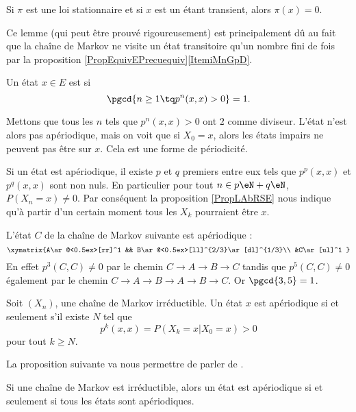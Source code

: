 \begin{lemma}
    Si \( \pi\) est une loi stationnaire et si \( x\) est un étant transient, alors \( \pi(x)=0\).
\end{lemma}
Ce lemme (qui peut être prouvé rigoureusement) est principalement dû au fait que la chaîne de Markov ne visite un état transitoire qu'un nombre fini de fois par la proposition \ref{PropEquivEPrecuequiv}\ref{ItemiMnGpD}.

\begin{definition}  \label{DefCxvOaT}
    Un état \( x\in E\) est  si
    \begin{equation}
        \pgcd\{ n\geq 1\tq p^n(x,x)>0 \}=1.
    \end{equation}
\end{definition}
Mettons que tous les \( n\) tels que \( p^n(x,x)>0\) ont \( 2\) comme diviseur. L'état n'est alors pas apériodique, mais on voit que si \( X_0=x\), alors les états impairs ne peuvent pas être sur \( x\). Cela est une forme de périodicité.

Si un état est apériodique, il existe \( p\) et \( q\) premiers entre eux tels que \( p^p(x,x)\) et \( p^q(x,x)\) sont non nuls. En particulier pour tout \( n\in p\eN+q\eN\), \( P(X_n=x)\neq 0\). Par conséquent la proposition \ref{PropLAbRSE} nous indique qu'à partir d'un certain moment tous les \( X_k\) pourraient être \( x\).

L'état \( C\) de la chaîne de Markov suivante est apériodique :
\begin{equation}
    \xymatrix{%
    A\ar@<0.5ex>[rr]^1  && B\ar@<0.5ex>[ll]^{2/3}\ar[dl]^{1/3}\\
    &C\ar[ul]^1
       }
\end{equation}
En effet \( p^3(C,C)\neq 0\) par le chemin \( C\to A\to B\to C\) tandis que \( p^5(C,C)\neq 0\) également par le chemin \( C\to A\to B\to A\to B\to C\). Or \( \pgcd\{ 3,5 \}=1\).

\begin{proposition}     \label{PropSaOysS}
    Soit \( (X_n)\), une chaîne de Markov irréductible. Un état \( x\) est apériodique si et seulement s'il existe \( N\) tel que
    \begin{equation}
        p^k(x,x)=P(X_k=x|X_0=x)>0
    \end{equation}
    pour tout \( k\geq N\).
\end{proposition}

La proposition suivante va nous permettre de parler de 
.
\begin{proposition}
    Si une chaîne de Markov est irréductible, alors un état est apériodique si et seulement si tous les états sont apériodiques.
\end{proposition}

